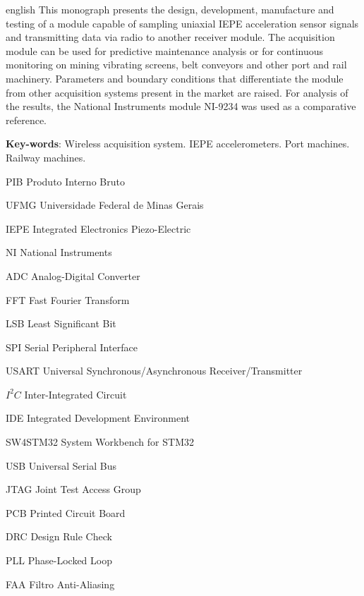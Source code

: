 \documentclass[
	12pt,				%
	openright,			%
	twoside,			%
	a4paper,			%
	english,			%
	french,				%
	spanish,			%
	brazil,				%
	]{abntex2}
\begin{document}
\begin{resumo}[Abstract]
	\begin{otherlanguage*}{english}
		This monograph presents the design, development, manufacture and testing of a module capable of sampling uniaxial IEPE acceleration sensor signals and transmitting data via radio to another receiver module. The acquisition module can be used for predictive maintenance analysis or for continuous monitoring on mining vibrating screens, belt conveyors and other port and rail machinery. Parameters and boundary conditions that differentiate the module from other acquisition systems present in the market are raised. For analysis of the results, the National Instruments module NI-9234 was used as a comparative reference.

		\vspace{\onelineskip}
		
		\noindent 
		\textbf{Key-words}: Wireless acquisition system. IEPE accelerometers. Port machines. Railway machines.
	\end{otherlanguage*}
\end{resumo}

\listoffigures*
\cleardoublepage


\begin{siglas}
	\item[PIB] Produto Interno Bruto
	\item[UFMG] Universidade Federal de Minas Gerais
	\item[IEPE] Integrated Electronics Piezo-Electric
	\item[NI] National Instruments
	\item[ADC] Analog-Digital Converter
	\item[FFT] Fast Fourier Transform
	\item[LSB] Least Significant Bit
	\item[SPI] Serial Peripheral Interface
	\item[USART] Universal Synchronous/Asynchronous Receiver/Transmitter
	\item[$I^2C$] Inter-Integrated Circuit
	\item[IDE] Integrated Development Environment
	\item[SW4STM32] System Workbench for STM32
	\item[USB] Universal Serial Bus
	\item[JTAG] Joint Test Access Group
	\item[PCB] Printed Circuit Board
	\item[DRC] Design Rule Check
	\item[PLL] Phase-Locked Loop
	\item[FAA] Filtro Anti-Aliasing
\end{siglas}
\end{document}
